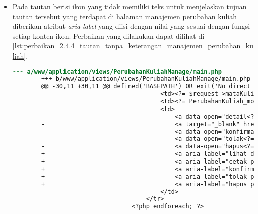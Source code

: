 \begin{itemize}
    \item Pada tautan berisi ikon yang tidak memiliki teks untuk menjelaskan tujuan tautan tersebut yang terdapat di halaman manajemen perubahan kuliah diberikan atribut \textit{aria-label} yang diisi dengan nilai yang sesuai dengan fungsi setiap konten ikon. Perbaikan yang dilakukan dapat dilihat di \ref{lst:perbaikan_2.4.4_tautan_tanpa_keterangan_manajemen_perubahan_kuliah}.
    \begin{lstlisting}[frame=single, label={lst:perbaikan_2.4.4_tautan_tanpa_keterangan_manajemen_perubahan_kuliah}, language=diff, caption=Perbaikan Kriteria Sukses 2.4.4 - Tautan Tanpa Keterangan di Halaman Manajemen Perubahan Kuliah]
        --- a/www/application/views/PerubahanKuliahManage/main.php
        +++ b/www/application/views/PerubahanKuliahManage/main.php
        @@ -30,11 +30,11 @@ defined('BASEPATH') OR exit('No direct script access allowed');
                                         <td><?= $request->mataKuliahCode ?></td>
                                         <td><?= PerubahanKuliah_model::CHANGETYPE_TYPES[$request->changeType] ?></td>
                                         <td>
        -                                    <a data-open="detail<?= $request->id ?>"><i class="fi-eye"></i></a>
        -                                    <a target="_blank" href="/PerubahanKuliahManage/printview/<?= $request->id ?>"><i class="fi-print"></i></a>
        -                                    <a data-open="konfirmasi<?= $request->id ?>"><i class="fi-like"></i></a>                                    
        -                                    <a data-open="tolak<?= $request->id ?>"><i class="fi-dislike"></i></a>
        -                                    <a data-open="hapus<?= $request->id ?>"><i class="fi-trash"></i></a>
        +                                    <a aria-label="lihat detail permohonan" data-open="detail<?= $request->id ?>"><i class="fi-eye"></i></a>
        +                                    <a aria-label="cetak permohonan" target="_blank" href="/PerubahanKuliahManage/printview/<?= $request->id ?>"><i class="fi-print"></i></a>
        +                                    <a aria-label="konfirmasi permohonan" data-open="konfirmasi<?= $request->id ?>"><i class="fi-like"></i></a>                                    
        +                                    <a aria-label="tolak permohonan" data-open="tolak<?= $request->id ?>"><i class="fi-dislike"></i></a>
        +                                    <a aria-label="hapus permohonan" data-open="hapus<?= $request->id ?>"><i class="fi-trash"></i></a>
                                         </td>
                                     </tr>
                                 <?php endforeach; ?>
    \end{lstlisting}
\end{itemize}

